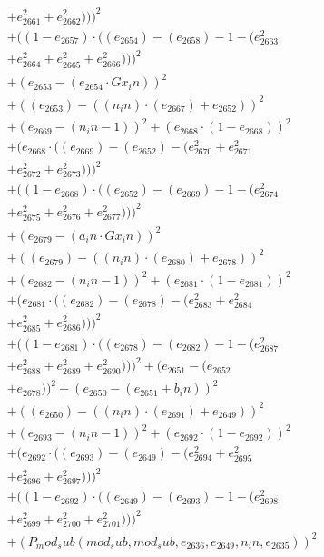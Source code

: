 \documentclass[10pt, a4paper]{article}
\begin{document}
\begin{align*}
& + e_{2661}^{2} + e_{2662}^{2})))^{2} \\
& + ((1 - e_{2657})  \cdot  ((e_{2654}) - (e_{2658}) - 1 - (e_{2663}^{2} \\
& + e_{2664}^{2} + e_{2665}^{2} + e_{2666}^{2})))^{2} \\
& + (e_{2653} - (e_{2654}  \cdot  Gx_in))^{2} \\
& + ((e_{2653}) - ((n_in)  \cdot  (e_{2667}) + e_{2652}))^{2} \\
& + (e_{2669} - (n_in - 1))^{2} + (e_{2668}  \cdot  (1 - e_{2668}))^{2} \\
& + (e_{2668}  \cdot  ((e_{2669}) - (e_{2652}) - (e_{2670}^{2} + e_{2671}^{2} \\
& + e_{2672}^{2} + e_{2673}^{2})))^{2} \\
& + ((1 - e_{2668})  \cdot  ((e_{2652}) - (e_{2669}) - 1 - (e_{2674}^{2} \\
& + e_{2675}^{2} + e_{2676}^{2} + e_{2677}^{2})))^{2} \\
& + (e_{2679} - (a_in  \cdot  Gx_in))^{2} \\
& + ((e_{2679}) - ((n_in)  \cdot  (e_{2680}) + e_{2678}))^{2} \\
& + (e_{2682} - (n_in - 1))^{2} + (e_{2681}  \cdot  (1 - e_{2681}))^{2} \\
& + (e_{2681}  \cdot  ((e_{2682}) - (e_{2678}) - (e_{2683}^{2} + e_{2684}^{2} \\
& + e_{2685}^{2} + e_{2686}^{2})))^{2} \\
& + ((1 - e_{2681})  \cdot  ((e_{2678}) - (e_{2682}) - 1 - (e_{2687}^{2} \\
& + e_{2688}^{2} + e_{2689}^{2} + e_{2690}^{2})))^{2} + (e_{2651} - (e_{2652} \\
& + e_{2678}))^{2} + (e_{2650} - (e_{2651} + b_in))^{2} \\
& + ((e_{2650}) - ((n_in)  \cdot  (e_{2691}) + e_{2649}))^{2} \\
& + (e_{2693} - (n_in - 1))^{2} + (e_{2692}  \cdot  (1 - e_{2692}))^{2} \\
& + (e_{2692}  \cdot  ((e_{2693}) - (e_{2649}) - (e_{2694}^{2} + e_{2695}^{2} \\
& + e_{2696}^{2} + e_{2697}^{2})))^{2} \\
& + ((1 - e_{2692})  \cdot  ((e_{2649}) - (e_{2693}) - 1 - (e_{2698}^{2} \\
& + e_{2699}^{2} + e_{2700}^{2} + e_{2701}^{2})))^{2} \\
& + (P_mod_sub(mod_sub, mod_sub, e_{2636}, e_{2649}, n_in, e_{2635}))^{2} \\

\end{align*}
\end{document}
